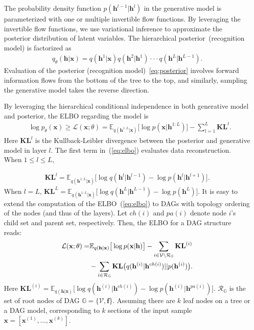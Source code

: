 \documentclass[sigconf, anonymous, review]{acmart}
\theoremstyle{plain}
\theoremstyle{definition}
\theoremstyle{remark}
\begin{document}
The  probability  density function $p(\mathbf{h}^{l-1} | \mathbf{h}^{l})$ in the generative  model is parameterized with one or multiple invertible  flow functions.  By leveraging the invertible  flow functions, we use variational inference  to approximate the posterior distribution of latent variables. 
The hierarchical posterior~(recognition model) is factorized as
\begin{align}\label{eq:posterior}
q_{\theta}(\mathbf{h}| \mathbf{x}) =  q(\mathbf{h}^1 | \mathbf{x})  q(\mathbf{h}^2 | \mathbf{h}^1) \cdot \cdot  \cdot  q(\mathbf{h}^{L} | \mathbf{h}^{L-1}).
\end{align}
Evaluation of the posterior (recognition model)~\eqref{eq:posterior} involves forward information flows from the bottom of the tree to the top, and similarly, sampling  the generative model takes the reverse direction.

By leveraging the hierarchical conditional independence in both  generative model and  posterior,  the ELBO regarding the model is 
\begin{align} \label{eq:elbo}
&\log p_{\theta}(\mathbf{x})
    \geqslant \mathcal{L}(\mathbf{x}; \theta)  = \mathbb{E}_{q(\mathbf{h}^{1:L}|\mathbf{x})}\big[ \log p(\mathbf{x}|\mathbf{h}^{1:L})  \big] - \sum_{l=1}^{L} \mathbf{KL}^l.
\end{align}
Here $\mathbf{KL}^l$ is the Kullback-Leibler divergence between the posterior and generative model in layer $l$. The first term in~(\ref{eq:elbo}) evaluates data reconstruction.  
When $1\leqslant l \leqslant L$, 

\vspace{-0.15in}
\begin{align}\label{eq:kl}
\mathbf{KL}^l 
=\mathbb{E}_{q(\mathbf{h}^{1:L}|\mathbf{x})}\big[  \log q(\mathbf{h}^{l}|\mathbf{h}^{l-1})   - \log p(\mathbf{h}^{l}|\mathbf{h}^{l+1}) \big].
\end{align}
When $l=L$, 
$\mathbf{KL}^L =  \mathbb{E}_{q(\mathbf{h}^{1:L}|\mathbf{x})}\big[  \log q(\mathbf{h}^{L}|\mathbf{h}^{L-1})- \log p(\mathbf{h}^{L})  \big].$ It is easy to extend the computation of the ELBO~(\ref{eq:elbo}) to DAGs with topology ordering of the nodes (and thus of the layers). 
Let $ch(i)$ and $pa(i)$ denote node $i$'s child set and parent set, respectively.
Then, the ELBO for a DAG structure reads:
\begin{align}\label{eq:elbo_dag}
\mathcal{L}(\mathbf{x}; \theta) =& \mathbb{E}_{q(\mathbf{h}|\mathbf{x})}\big[ \log p(\mathbf{x}|\mathbf{h})  \big] -  \sum_{i \in \mathcal{V}  \setminus  \mathcal{R}_{ \mathbb{G} }} \textbf{\text{KL}}^{(i)}  \\ \notag
&-    \sum_{i \in  \mathcal{R}_{ \mathbb{G} }  }  \textbf{\text{KL}}\big(q(\mathbf{h}^{(i)} | \mathbf{h}^{ch(i)} )   || p(\mathbf{h}^{(i)})  \big) .
\end{align}
Here $\mathbf{KL}^{(i)}=\mathbb{E}_{q(\mathbf{h}|\mathbf{x})}\big[  \log q(\mathbf{h}^{(i)}|\mathbf{h}^{ch(i)})   - \log p(\mathbf{h}^{(i)}|\mathbf{h}^{pa(i)}) \big]$.  $\mathcal{R}_{ \mathbb{G}}$ is the set of root  nodes of DAG $\mathbb{G} = \{\mathcal{V}, \mathbf{f}\}$. Assuming there are $k$ leaf nodes on a tree or a DAG model, corresponding to $k$ sections of the input sample $\mathbf{x} = [\mathbf{x}^{(1)}, ..., \mathbf{x}^{(k)}]$. 
\end{document}
